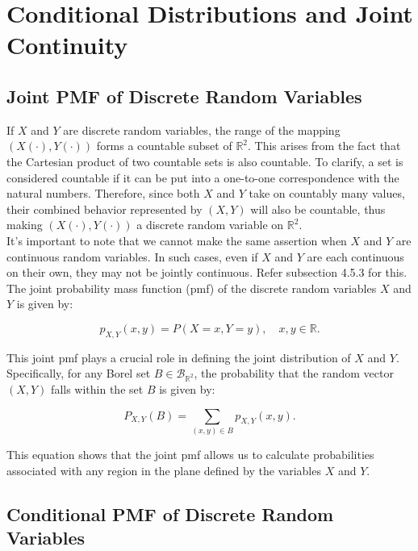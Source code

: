 \section{Conditional Distributions and Joint Continuity}

\subsection{Joint PMF of Discrete Random Variables}

If \( X \) and \( Y \) are discrete random variables, the range of the mapping \( (X(\cdot), Y(\cdot)) \) forms a countable subset of \( \mathbb{R}^2 \). This arises from the fact that the Cartesian product of two countable sets is also countable. To clarify, a set is considered countable if it can be put into a one-to-one correspondence with the natural numbers. Therefore, since both \( X \) and \( Y \) take on countably many values, their combined behavior represented by \( (X, Y) \) will also be countable, thus making \( (X(\cdot), Y(\cdot)) \) a discrete random variable on \( \mathbb{R}^2 \).\\

It's important to note that we cannot make the same assertion when \( X \) and \( Y \) are continuous random variables. In such cases, even if \( X \) and \( Y \) are each continuous on their own, they may not be jointly continuous. Refer subsection 4.5.3 for this. \\

The joint probability mass function (pmf) of the discrete random variables \( X \) and \( Y \) is given by:

\[
p_{X,Y}(x, y) = P(X = x, Y = y), \quad x, y \in \mathbb{R}.
\]

This joint pmf plays a crucial role in defining the joint distribution of \( X \) and \( Y \). Specifically, for any Borel set \( B \in \mathcal{B}_{\mathbb{R}^2} \), the probability that the random vector \( (X, Y) \) falls within the set \( B \) is given by:

\[
P_{X,Y}(B) = \sum_{(x,y) \in B} p_{X,Y}(x, y).
\]

This equation shows that the joint pmf allows us to calculate probabilities associated with any region in the plane defined by the variables \( X \) and \( Y \).


\subsection{Conditional PMF of Discrete Random Variables}

